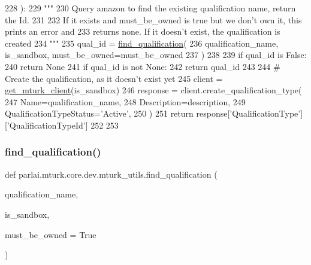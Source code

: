 \begin{DoxyCode}
228 ):
229     \textcolor{stringliteral}{"""}
230 \textcolor{stringliteral}{    Query amazon to find the existing qualification name, return the Id.}
231 \textcolor{stringliteral}{}
232 \textcolor{stringliteral}{    If it exists and must\_be\_owned is true but we don't own it, this prints an error and}
233 \textcolor{stringliteral}{    returns none. If it doesn't exist, the qualification is created}
234 \textcolor{stringliteral}{    """}
235     qual\_id = \hyperlink{namespaceparlai_1_1mturk_1_1core_1_1mturk__utils_a54121023abc81124ba03cc50d5f23af3}{find\_qualification}(
236         qualification\_name, is\_sandbox, must\_be\_owned=must\_be\_owned
237     )
238 
239     \textcolor{keywordflow}{if} qual\_id \textcolor{keywordflow}{is} \textcolor{keyword}{False}:
240         \textcolor{keywordflow}{return} \textcolor{keywordtype}{None}
241     \textcolor{keywordflow}{if} qual\_id \textcolor{keywordflow}{is} \textcolor{keywordflow}{not} \textcolor{keywordtype}{None}:
242         \textcolor{keywordflow}{return} qual\_id
243 
244     \textcolor{comment}{# Create the qualification, as it doesn't exist yet}
245     client = \hyperlink{namespaceparlai_1_1mturk_1_1core_1_1mturk__utils_a577e2527c04682284394b0951a090695}{get\_mturk\_client}(is\_sandbox)
246     response = client.create\_qualification\_type(
247         Name=qualification\_name,
248         Description=description,
249         QualificationTypeStatus=\textcolor{stringliteral}{'Active'},
250     )
251     \textcolor{keywordflow}{return} response[\textcolor{stringliteral}{'QualificationType'}][\textcolor{stringliteral}{'QualificationTypeId'}]
252 
253 
\end{DoxyCode}
\mbox{\label{namespaceparlai_1_1mturk_1_1core_1_1dev_1_1mturk__utils_acd636315cbbf11cc5d9d641173e51586}} 
\subsubsection{\texorpdfstring{find\+\_\+qualification()}{find\_qualification()}}
{\footnotesize\ttfamily def parlai.\+mturk.\+core.\+dev.\+mturk\+\_\+utils.\+find\+\_\+qualification (\begin{DoxyParamCaption}\item[{}]{qualification\+\_\+name,  }\item[{}]{is\+\_\+sandbox,  }\item[{}]{must\+\_\+be\+\_\+owned = {\ttfamily True} }\end{DoxyParamCaption})}

